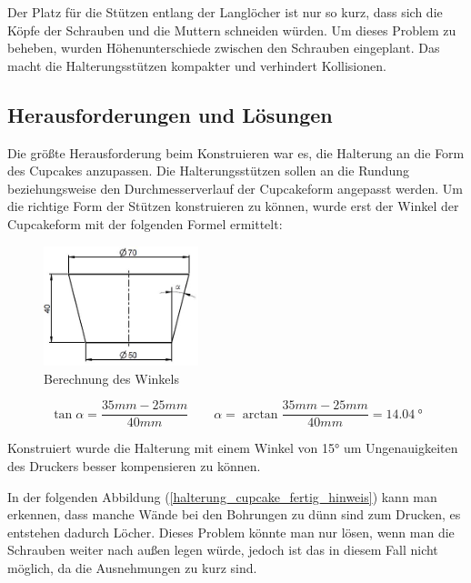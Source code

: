 	Der Platz für die Stützen entlang der Langlöcher ist nur so kurz, dass sich die Köpfe der Schrauben und die Muttern schneiden würden.
	Um dieses Problem zu beheben, wurden Höhenunterschiede zwischen den Schrauben eingeplant.
	Das macht die Halterungsstützen kompakter und verhindert Kollisionen.

			\newpage

	\subsection{Herausforderungen und Lösungen}

	Die größte Herausforderung beim Konstruieren war es, die Halterung an die Form des Cupcakes anzupassen.
	Die Halterungsstützen sollen an die Rundung beziehungsweise den Durchmesserverlauf der Cupcakeform angepasst werden.
	Um die richtige Form der Stützen konstruieren zu können, wurde erst der Winkel der Cupcakeform mit der  folgenden Formel ermittelt:

			\begin{figure}[H]
			\begin{centering}
			\includegraphics[width = 0.4\textwidth]{Bilder/berechnung_winkel}
			\par\end{centering}
			\caption{Berechnung des Winkels}
			\label{berechnung_winkel}
			\end{figure}

			\[
 				\tan \alpha = \frac{35mm-25mm}{40mm}  \qquad \alpha = \arctan \frac{35mm-25mm}{40mm} = \SI{14.04}{\degree}
 			\]

	Konstruiert wurde die Halterung mit einem Winkel von 15° um Ungenauigkeiten des Druckers besser kompensieren zu können.

	In der folgenden Abbildung (\ref{halterung_cupcake_fertig_hinweis}) kann man erkennen, dass manche Wände bei den Bohrungen zu dünn sind zum Drucken, es entstehen dadurch Löcher.
	Dieses Problem könnte man nur lösen, wenn man die Schrauben weiter nach außen legen würde, jedoch ist das in diesem Fall nicht möglich, da die Ausnehmungen zu kurz sind.


